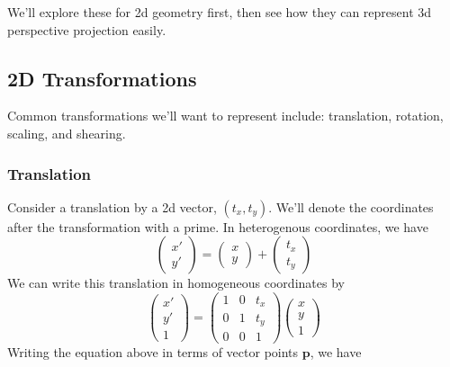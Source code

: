 We'll explore these for 2d geometry first, then see how they can represent 3d perspective projection easily.



\subsection{2D Transformations}
\label{sect:2dtransforms}
Common transformations we'll want to represent include:  translation, rotation, scaling, and shearing.
\subsubsection{Translation}
Consider a translation by a 2d vector, $(t_x, t_y)$. We'll denote the coordinates after the transformation with a prime. In heterogenous coordinates, we have
\begin{equation}
        \left (
    \begin{array}{c}
    x' \\
    y' 
    \end{array}
    \right )
    =
            \left (
    \begin{array}{c}
    x \\
    y 
    \end{array}
    \right )
    +
            \left (
    \begin{array}{c}
    t_x \\
    t_y 
    \end{array}
    \right )
\end{equation}
We can write this translation in homogeneous coordinates by
\begin{equation}
            \left (
    \begin{array}{c}
    x' \\
    y' \\
    1
    \end{array}
    \right )
    =
            \left (
    \begin{array}{ccc}
    1 & 0 & t_x \\
    0 & 1 & t_y \\
    0 & 0 & 1
    \end{array}
    \right )
            \left (
    \begin{array}{c}
    x \\
    y \\
    1
    \end{array}
    \right )
\end{equation}
Writing the equation above in terms of vector points $\mathbf{p}$, we have
